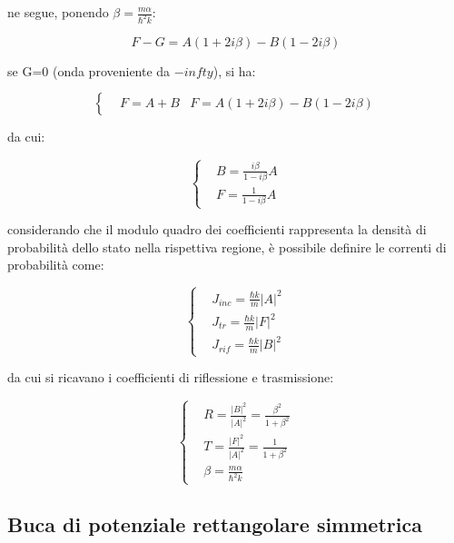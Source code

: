 \documentclass{article}
\begin{document}
ne segue, ponendo $\beta=\frac{m\alpha}{\hbar^2k}$:

\begin{equation}
  F-G=A(1+2i\beta)-B(1-2i\beta)
\end{equation}

se G=0 (onda proveniente da $-infty$), si ha:

\begin{equation}
  \left\{
  \begin{aligned}
     & F=A+B
     & F= A(1+2i\beta)-B(1-2i\beta)
  \end{aligned}
  \right.
\end{equation}

da cui:

\begin{equation}
  \left\{
  \begin{aligned}
     & B= \frac{i\beta}{1-i\beta}A \\
     & F= \frac{1}{1-i\beta}A
  \end{aligned}
  \right.
\end{equation}

considerando che il modulo quadro dei coefficienti rappresenta la densità di probabilità dello stato nella rispettiva regione,
è possibile definire le correnti di probabilità come:

\begin{equation}
  \left\{
  \begin{aligned}
     & J_{inc}= \frac{\hbar k}{m}|A|^2 \\
     & J_{tr}= \frac{\hbar k}{m}|F|^2  \\
     & J_{rif}= \frac{\hbar k}{m}|B|^2
  \end{aligned}
  \right.
\end{equation}

da cui si ricavano i coefficienti di riflessione e trasmissione:

\begin{equation}
  \left\{
  \begin{aligned}
     & R= \frac{|B|^2}{|A|^2}= \frac{\beta^2}{1+\beta^2} \\
     & T= \frac{|F|^2}{|A|^2}= \frac{1}{1+\beta^2}       \\
     & \beta= \frac{m\alpha}{\hbar^2k}
  \end{aligned}
  \right.
\end{equation}

\subsection{Buca di potenziale rettangolare simmetrica}
\end{document}
